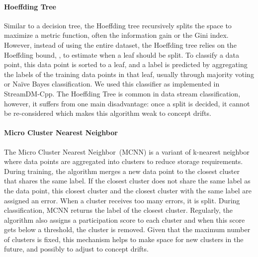 \paragraph{Hoeffding Tree~\cite{VFDT}}
Similar to a decision tree, the Hoeffding tree recursively splits the space to maximize a
metric function, often the
information gain or the Gini index. However,
instead of using the entire dataset, the Hoeffding
tree relies on the Hoeffding bound, , to estimate
when a leaf should be split. To classify a
data point, this data point is sorted to a leaf,
and a label is predicted by aggregating the labels of the training data points in that leaf, usually through
majority voting or Naïve Bayes classification.
We used this classifier as implemented in
StreamDM-Cpp.
The Hoeffding Tree is common in data stream
classification, however, it suffers from one main
disadvantage: once a split is decided, it cannot
be re-considered which makes this algorithm weak
to concept drifts.

\paragraph{Micro Cluster Nearest Neighbor~\cite{mc-nn}}
The Micro Cluster Nearest Neighbor~(MCNN) is a
variant of k-nearest neighbor where data points are
aggregated into clusters to reduce storage requirements.  During training, the
algorithm merges a new data point to the closest
cluster that shares the same label. If the closest
cluster does not share the same label as the data
point, this closest cluster and the closest
cluster with the same label are assigned an error. When a cluster receives too
many errors, it is split. During classification,
MCNN returns the label of the closest cluster.
Regularly, the algorithm also assigns a
participation score to each cluster and when this
score gets below a threshold, the cluster is
removed. Given that the maximum number of clusters
is fixed, this mechanism helps to make space for
new clusters in the future, and possibly to adjust to concept drifts.  

